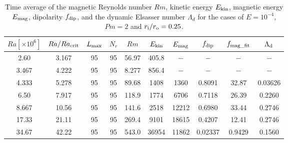 \begin{table}
\begin{center}
\caption{Time average of the magnetic Reynolds number $Rm$, kinetic energy $E_{\rm kin}$, magnetic energy $E_{\rm mag}$, dipolarity $f_{\rm dip}$, and the dynamic Elsasser number $\Lambda_{d}$ for the cases of $E = 10^{-4}$, $Pm = 2$ and $r_{\rm i}/r_{\rm o} = 0.25$.}
\label{table:Summary_25_Ek4}
%
\begin{tabular}{cccccccccc}
    \hline
     $Ra[\times 10^6]$  &  $Ra/Ra_{\rm crit}$& 
     $L_{\rm max}$ & $N_{r}$ & $Rm$ 
     & $E_{\rm kin}$  &  $E_{\rm mag}$ & $f_{\rm dip}$ & $f_{\rm mag\_fit}$ & $\Lambda_{\rm d}$\\
    \hline
      2.60 & 3.167 & 95 & 95 & 56.97 & 405.8 & $-$ & $-$ & $-$ & $-$ \\
      3.467 & 4.222 & 95 & 95 & 8.277 & 856.4 & $-$ & $-$ & $-$ & $-$ \\
      4.333 & 5.278 & 95 & 95 & 89.68 & 1408 & 1360 & 0.8091 & 32.87 & 0.03626 \\
      6.50 & 7.917 & 95 & 95 & 118.9 & 1774 & 6706 & 0.7118 & 26.39 & 0.2260 \\
      8.667 & 10.56 & 95 & 95 & 141.6 & 2518 & 12212 & 0.6980 & 33.44 & 0.2746 \\
      17.33 & 21.11 & 95 & 95 & 269.4 & 9101 & 18615 & 0.4207 & 12.41 & 0.2746 \\
      34.67 & 42.22 & 95 & 95 & 543.0 & 36954 & 11862 & 0.02337 & 0.9429 & 0.1560 \\
    \hline
  \end{tabular}
\end{center}
\end{table}